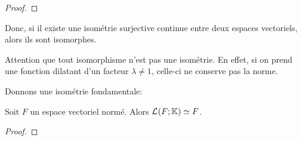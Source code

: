\ifdefined\outputproof
\begin{proof}

\end{proof}
\fi

Donc, si il existe une isométrie surjective continue entre deux espaces
vectoriels, alors ils sont isomorphes.

Attention que tout isomorphisme n'est pas une isométrie. En effet, si on prend
une fonction dilatant d'un facteur $\lambda \neq 1$, celle-ci ne conserve pas la
norme.

Donnons une isométrie fondamentale:

\begin{proposition}
	Soit $F$ un espace vectoriel normé. Alors $\mathcal{L}_{}(F; \mathbb{K})
	\simeq F$.
\end{proposition}

\ifdefined\outproof
\begin{proof}

\end{proof}
\fi
